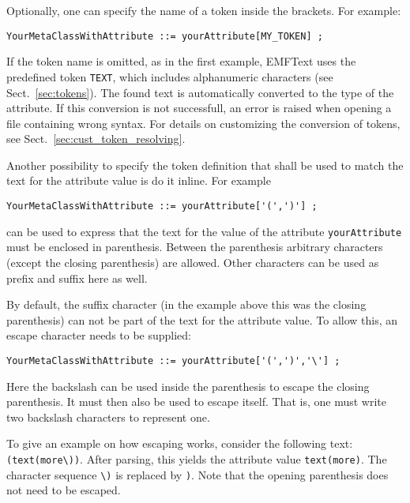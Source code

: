 Optionally, one can specify the name of a token inside the brackets. For example:

\lstset{language=CS}
\begin{lstlisting}
YourMetaClassWithAttribute ::= yourAttribute[MY_TOKEN] ;
\end{lstlisting}

If the token name is omitted, as in the first example, EMFText uses the 
predefined token \texttt{TEXT}, which includes alphanumeric characters (see 
Sect.~\ref{sec:tokens}). The
found text is automatically converted to the type of the attribute. If this 
conversion is not successfull, an error is raised when opening a file containing 
wrong syntax. For details on customizing the conversion of tokens, see
Sect.~\ref{sec:cust_token_resolving}.

Another possibility to specify the token definition that shall be used to match 
the text for the attribute value is do it inline. For example

\lstset{language=CS}
\begin{lstlisting}
YourMetaClassWithAttribute ::= yourAttribute['(',')'] ;
\end{lstlisting}

can be used to express that the text for the value of the attribute
\texttt{yourAttribute} must be enclosed in parenthesis. Between the parenthesis 
arbitrary characters (except the closing 
parenthesis) are allowed. Other characters can be used as prefix and suffix here as 
well.

By default, the suffix character (in the example above this was the closing 
parenthesis) can not be part of the text for the attribute value. To allow this, 
an escape character needs to be supplied:

\lstset{language=CS}
\begin{lstlisting}
YourMetaClassWithAttribute ::= yourAttribute['(',')','\'] ;
\end{lstlisting}

Here the backslash can be used inside the parenthesis to escape the closing 
parenthesis. It must then also be used to escape itself. That is, one must
write two backslash characters to represent one. 

To give an example on how escaping works, consider the following text:
\texttt{(text(more\textbackslash{}))}. After parsing, this yields the attribute
value \texttt{text(more)}. The character sequence \texttt{\textbackslash{})} is
replaced by \texttt{)}. Note that the opening parenthesis does not need to be
escaped.

